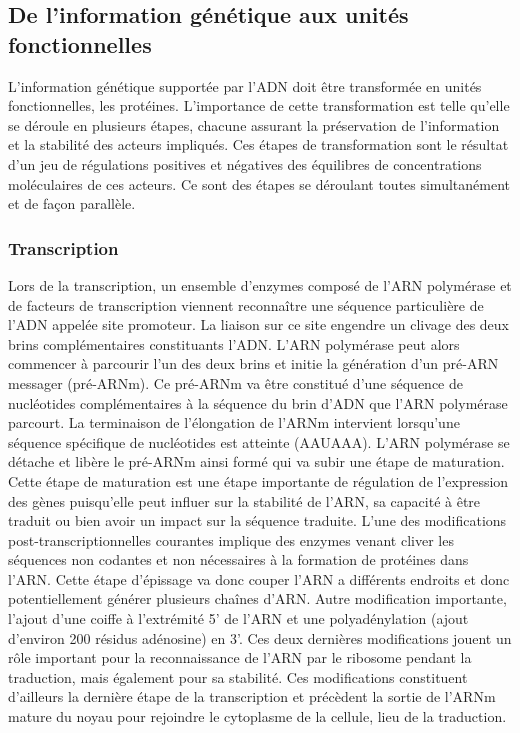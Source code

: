 \subsection{De l'information génétique aux unités fonctionnelles} \label{trans_trad}

L'information génétique supportée par l'ADN doit être transformée en unités fonctionnelles, les protéines. L'importance de cette transformation est telle qu'elle se déroule en plusieurs étapes, chacune assurant la préservation de l'information et la stabilité des acteurs impliqués. Ces étapes de transformation sont le résultat d'un jeu de régulations positives et négatives des équilibres de concentrations moléculaires de ces acteurs. Ce sont des étapes se déroulant toutes simultanément et de façon parallèle.

\subsubsection{Transcription}

Lors de la transcription, un ensemble d'enzymes composé de l'ARN polymérase et de facteurs de transcription viennent reconnaître une séquence particulière de l'ADN appelée site promoteur. La liaison sur ce site engendre un clivage des deux brins complémentaires constituants l'ADN. L'ARN polymérase peut alors commencer à parcourir l'un des deux brins et initie la génération d'un pré-ARN messager (pré-ARNm). Ce pré-ARNm va être constitué d'une séquence de nucléotides complémentaires à la séquence du brin d'ADN que l'ARN polymérase parcourt. La terminaison de l'élongation de l'ARNm intervient lorsqu’une séquence spécifique de nucléotides est atteinte (AAUAAA). L'ARN polymérase se détache et libère le pré-ARNm ainsi formé qui va subir une étape de maturation. Cette étape de maturation est une étape importante de régulation de l'expression des gènes puisqu'elle peut influer sur la stabilité de l'ARN, sa capacité à être traduit ou bien avoir un impact sur la séquence traduite. L'une des modifications post-transcriptionnelles courantes implique des enzymes venant cliver les séquences non codantes et non nécessaires à la formation de protéines dans l'ARN. Cette étape d'épissage va donc couper l'ARN a différents endroits et donc potentiellement générer plusieurs chaînes d'ARN. Autre modification importante, l'ajout d'une coiffe à l'extrémité 5' de l'ARN et une polyadénylation (ajout d'environ 200 résidus adénosine) en 3'. Ces deux dernières modifications jouent un rôle important pour la reconnaissance de l'ARN par le ribosome pendant la traduction, mais également pour sa stabilité. Ces modifications constituent d'ailleurs la dernière étape de la transcription et précèdent la sortie de l'ARNm mature du noyau pour rejoindre le cytoplasme de la cellule, lieu de la traduction.

